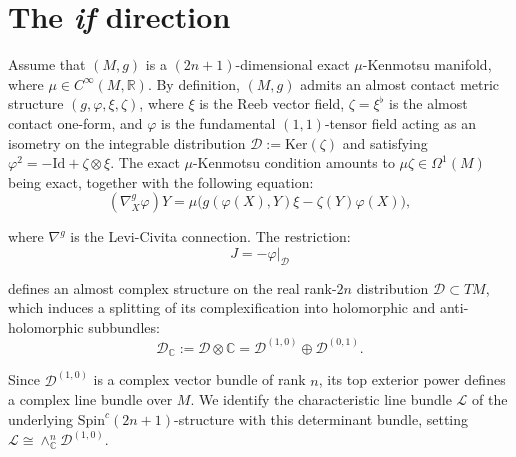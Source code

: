 \documentclass[10pt,a4paper,twoside,reqno]{amsart}
\theoremstyle{plain}
\theoremstyle{definition}
\theoremstyle{remark}
\renewcommand{\ker}{\mathrm{Ker}}
\begin{document}

\section{The \emph{if} direction}
\label{sec:if}


Assume that $(M,g)$ is a $(2n+1)$-dimensional exact $\mu$-Kenmotsu manifold, where $\mu \in C^\infty(M, \mathbb{R})$. By definition, $(M,g)$ admits an almost contact metric structure $(g,\varphi,\xi,\zeta)$, where $\xi$ is the Reeb vector field, $\zeta = \xi^\flat$ is the almost contact one-form, and $\varphi$ is the fundamental $(1,1)$-tensor field acting as an isometry on the integrable distribution $\mathcal{D} := \ker(\zeta)$ and satisfying $\varphi^2 = -\mathrm{Id} + \zeta \otimes \xi$. The exact $\mu$-Kenmotsu condition amounts to $\mu\zeta\in \Omega^1(M)$ being exact, together with the following equation:
\begin{equation*}
(\nabla^g_X\varphi)Y=\mu\big(g(\varphi(X),Y)\xi-\zeta(Y)\varphi(X)\big),
\end{equation*}

\noindent
where $\nabla^g$ is the Levi-Civita connection. The restriction:
\begin{equation*}
J = -\varphi\vert_{\mathcal{D}}
\end{equation*}

\noindent
defines an almost complex structure on the real rank-$2n$ distribution $\mathcal{D} \subset TM$, which induces a splitting of its complexification into holomorphic and anti-holomorphic subbundles:
\begin{equation*}
\mathcal{D}_{\mathbb{C}} := \mathcal{D}\otimes \mathbb{C} = \mathcal{D}^{(1,0)} \oplus \mathcal{D}^{(0,1)}.
\end{equation*}

\noindent
Since $\mathcal{D}^{(1,0)}$ is a complex vector bundle of rank $n$, its top exterior power defines a complex line bundle over $M$. We identify the characteristic line bundle $\mathcal{L}$ of the underlying $\mathrm{Spin}^c(2n+1)$-structure with this determinant bundle, setting $\mathcal{L} \cong \wedge^n_{\mathbb{C}} \mathcal{D}^{(1,0)}$.
\end{document}
